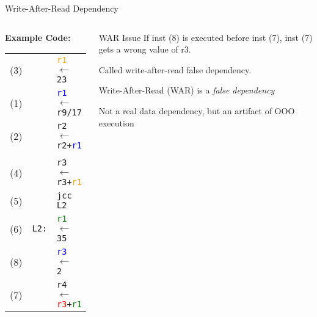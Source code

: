 \documentclass[aspectratio=169,12pt]{beamer}
\begin{document}
\begin{frame}{Write-After-Read Dependency}
  \begin{columns}
    \begin{column}{0.5\textwidth}
      \textbf{Example Code:} \\
      \begin{tabular}{lll}
        (3) & & \texttt{\textcolor{orange}{r1} $\leftarrow$ 23} \\
        (1) & & \texttt{\textcolor{blue}{r1} $\leftarrow$ r9/17} \\
        (2) & & \texttt{r2 $\leftarrow$ r2+\textcolor{blue}{r1}} \\
        & & \\
        (4) & & \texttt{r3 $\leftarrow$ r3+\textcolor{orange}{r1}} \\
        (5) & & \texttt{jcc L2} \\
        (6) & \texttt{L2:} & \texttt{\textcolor{green}{r1} $\leftarrow$ 35} \\
        (8) & & \texttt{\textcolor{blue}{r3} $\leftarrow$ 2} \\
        (7) & & \texttt{r4 $\leftarrow$ \textcolor{red}{r3}+\textcolor{green}{r1}} \\
      \end{tabular}
    \end{column}
    
    \begin{column}{0.5\textwidth}
      \begin{block}{WAR Issue}
        If inst (8) is executed before inst (7), inst (7) gets a wrong value of r3.
        
        \vspace{0.3cm}
        
        Called \alert{write-after-read false dependency}.
        
        \vspace{0.3cm}
        
        \alert{Write-After-Read (WAR) is a \emph{false dependency}}
        
        Not a real data dependency, but an artifact of OOO execution
      \end{block}
      
    \end{column}
  \end{columns}
\end{frame}
\end{document}
